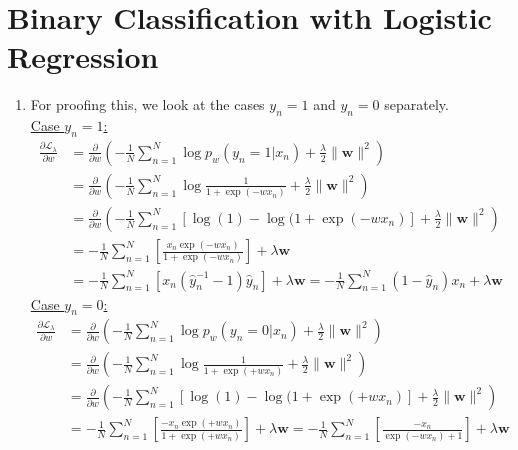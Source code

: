 \documentclass[12pt]{article}
\begin{document}
\newpage

\section{Binary Classification with Logistic Regression}

\begin{enumerate}
	\item For proofing this, we look at the cases $y_n=1$ and $y_n = 0$ separately.\\
	\noindent
	\underline{Case $y_n = 1$:}
	\begin{align*}
	\frac{\partial \mathcal{L}_\lambda}{\partial w} &= \frac{\partial}{\partial w} \left( -\frac{1}{N} \sum_{n=1}^{N} \log p_w (y_n = 1|x_n) + \frac{\lambda}{2}\lVert \textbf{w} \rVert^2  \right) \\
	&= \frac{\partial}{\partial w} \left( -\frac{1}{N} \sum_{n=1}^{N} \log\frac{1}{1+\exp(-wx_n)} + \frac{\lambda}{2}\lVert \textbf{w} \rVert^2  \right) \\
	&= \frac{\partial}{\partial w} \left( -\frac{1}{N} \sum_{n=1}^{N} \left[\log(1)-\log(1+\exp(-wx_n) \right] + \frac{\lambda}{2}\lVert \textbf{w} \rVert^2  \right) \\
	&= -\frac{1}{N} \sum_{n=1}^{N} \left[ \frac{x_n \exp(-wx_n)}{1+\exp(-wx_n)} \right] + \lambda\textbf{w}   \\
	&= -\frac{1}{N} \sum_{n=1}^{N} \left[ x_n(\hat{y}_n^{-1}-1)\hat{y}_n \right] + \lambda\textbf{w} = 
	-\frac{1}{N} \sum_{n=1}^{N} (1- \hat{y}_n)x_n + \lambda\textbf{w} 
	\end{align*}
	\underline{Case $y_n = 0$:}
	\begin{align*}
	\frac{\partial \mathcal{L}_\lambda}{\partial w} &= \frac{\partial}{\partial w} \left( -\frac{1}{N} \sum_{n=1}^{N} \log p_w (y_n = 0|x_n) + \frac{\lambda}{2}\lVert \textbf{w} \rVert^2  \right) \\
	&= \frac{\partial}{\partial w} \left( -\frac{1}{N} \sum_{n=1}^{N} \log\frac{1}{1+\exp(+wx_n)} + \frac{\lambda}{2}\lVert \textbf{w} \rVert^2  \right) \\
	&= \frac{\partial}{\partial w} \left( -\frac{1}{N} \sum_{n=1}^{N} \left[\log(1)-\log(1+\exp(+wx_n) \right] + \frac{\lambda}{2}\lVert \textbf{w} \rVert^2  \right) \\
	&= -\frac{1}{N} \sum_{n=1}^{N} \left[ \frac{-x_n \exp(+wx_n)}{1+\exp(+wx_n)} \right] + \lambda\textbf{w}   
	= -\frac{1}{N} \sum_{n=1}^{N} \left[ \frac{-x_n }{\exp(-wx_n)+1} \right] + \lambda\textbf{w}   \\

\end{align*}
\end{enumerate}
\end{document}
